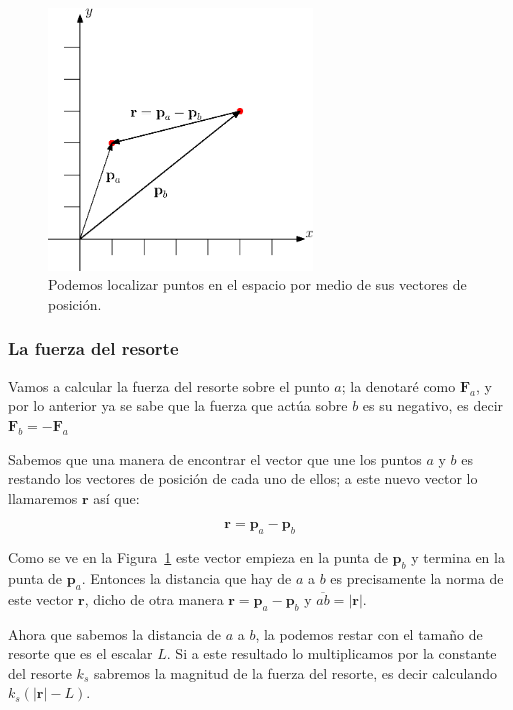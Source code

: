 \begin{figure}
 \centering
 \includegraphics[width=7cm]{Img/01/vector_posicion}
 \caption[Ejemplo de vectores de posición]{ 
 Podemos localizar puntos en el espacio por medio de sus vectores de posición.
 } \label{posVec:fig}
\end{figure}

\subsubsection{La fuerza del resorte}

Vamos a calcular la fuerza del resorte sobre el punto $a$; la denotaré como $\textbf{F}_a$, y por lo anterior ya se sabe que la fuerza que actúa sobre $b$ es su negativo, es decir $\textbf{F}_b = -\textbf{F}_a$

Sabemos que una manera de encontrar el vector que une los puntos $a$ y $b$ es restando los vectores de posición de cada uno de ellos; a este nuevo vector lo llamaremos $\textbf{r}$ así que:

\begin{equation}
\textbf{r} = \textbf{p}_a - \textbf{p}_b
\end{equation}

Como se ve en la Figura~\ref{posVec:fig} este vector empieza en la punta de $\textbf{p}_b$ y termina en la punta de $\textbf{p}_a$.
Entonces la distancia que hay de $a$ a $b$ es precisamente la norma de este vector $\textbf{r}$, dicho de otra manera $\textbf{r} = \textbf{p}_a - \textbf{p}_b$ y $\overline{ab} = |\textbf{r}|$.

Ahora que sabemos la distancia de $a$ a $b$, la podemos restar con el tamaño de resorte que es el escalar $L$.
Si a este resultado lo multiplicamos por la constante del resorte $k_s$ sabremos la magnitud de la fuerza del resorte, es decir calculando $k_s \left( |\textbf{r}| - L \right)$.

